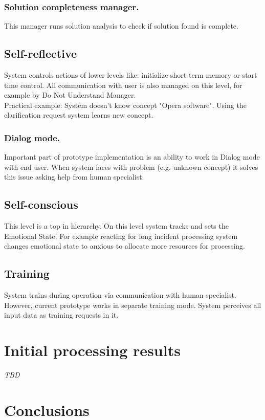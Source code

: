 \documentclass[runningheads,a4paper]{llncs}
\begin{document}
\subsubsection{Solution completeness manager.} This manager runs solution analysis to check if solution found is complete.

\subsection{Self-reflective}
System controls actions of lower levels like: initialize short term memory or start time control. All communication with user is also managed on this level, for example by Do Not Understand Manager.\\
Practical example: System doesn't know concept "Opera software". Using the clarification request system learns new concept.

\subsubsection{Dialog mode.}
Important part of prototype implementation is an ability to work in Dialog mode with end user. When system faces with problem (e.g. unknown concept) it solves this issue asking help from human specialist.

\subsection{Self-conscious}
This level is a top in hierarchy. On this level system tracks and sets the Emotional State. For example reacting for long incident processing system changes emotional state to anxious to allocate more resources for processing.

\subsection{Training}
System trains during operation via communication with human specialist. However, current prototype works in separate training mode. System perceives all input data as training requests in it.

\section{Initial processing results}

\emph{TBD}

\section{Conclusions}
\end{document}
